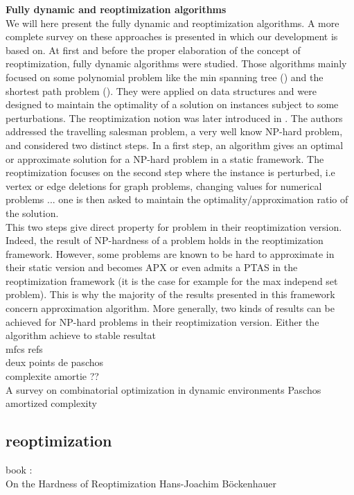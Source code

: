 \documentclass[a4paper]{book}
\newcommand{\subsectionToc}[1]{\subsection*{#1} \addcontentsline{toc}{subsection}{#1} \markboth{#1}{}}
\begin{document}
\textbf{Fully dynamic and reoptimization algorithms}\\
We will here present the fully dynamic and reoptimization algorithms. A more complete survey on these approaches is presented in \cite{boria2011survey} which our development is based on. At first and before the proper elaboration of the concept of reoptimization, fully dynamic algorithms were studied. Those algorithms mainly focused on some polynomial problem like the {\sc min spanning tree} (\cite{frederickson1985data}) and the {\sc shortest path} problem (\cite{even1985updating}). They were applied on data structures and were designed to maintain the optimality of a solution on instances subject to some perturbations. The reoptimization notion was later introduced in \cite{archetti2003reoptimizing}. The authors addressed the {\sc travelling salesman} problem, a very well know NP-hard problem, and considered two distinct steps. In a first step, an algorithm gives an optimal or approximate solution for a NP-hard problem in a static framework. The reoptimization focuses on the second step where the instance is perturbed, i.e vertex or edge deletions for graph problems, changing values for numerical problems ... one is then asked to maintain the optimality/approximation ratio of the solution. \\
This two steps give direct property for problem in their reoptimization version. Indeed, the result of NP-hardness of a problem holds in the reoptimization framework. However, some problems are known to be hard to approximate in their static version and becomes APX or even admits a PTAS in the reoptimization framework (it is the case for example for the {\sc max independ set} problem). This is why the majority of the results presented in this framework concern approximation algorithm. More generally, two kinds of results can be achieved for NP-hard problems in their reoptimization version. Either the algorithm achieve to
stable resultat \\
mfcs refs \\
deux points de paschos\\
complexite amortie ?? \\

 

A survey on combinatorial optimization in dynamic environments Paschos\\
amortized complexity

\subsectionToc{reoptimization}

book : \\
On the Hardness of Reoptimization Hans-Joachim Böckenhauer\\
\end{document}
